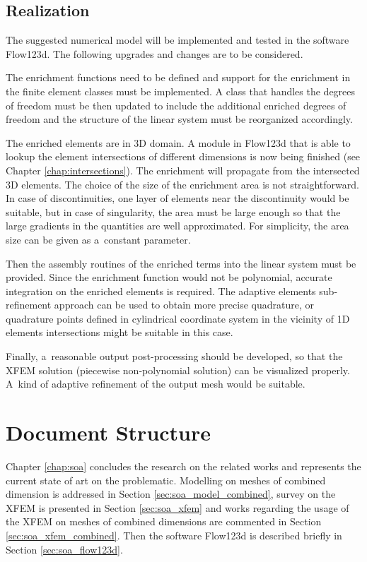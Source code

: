 \documentclass[bibliography=totocnumbered,dvipsnames,FM,Dis]{tulthesis}
\begin{document}
\subsection{Realization} \label{sec:realization}
The suggested numerical model will be implemented and tested in the software Flow123d.
The following upgrades and changes are to be considered.

The enrichment functions need to be defined and support for the enrichment in the finite element classes must be implemented. 
A class that handles the degrees of freedom must be then updated to include the additional enriched degrees of freedom
and the structure of the linear system must be reorganized accordingly.

The enriched elements are in 3D domain. A module in Flow123d that is able to lookup the element intersections
of different dimensions is now being finished (see Chapter \ref{chap:intersections}). The enrichment will propagate from the intersected 3D elements.
The choice of the size of the enrichment area is not straightforward. In case of discontinuities, one layer of elements
near the discontinuity would be suitable, but in case of singularity, the area must be large enough so that 
the large gradients in the quantities are well approximated. For simplicity, the area size can be given as
a~constant parameter.

Then the assembly routines of the enriched terms into the linear system must be provided.
Since the enrichment function would not be polynomial, accurate integration on the enriched elements is required. 
The adaptive elements sub-refinement approach can be used to obtain more precise quadrature, 
or quadrature points defined in cylindrical coordinate system in the vicinity of 1D elements intersections
might be suitable in this case.

Finally, a~reasonable output post-processing should be developed, so that the XFEM solution (piecewise non-polynomial solution)
can be visualized properly. A~kind of adaptive refinement of the output mesh would be suitable.


\section{Document Structure} \label{sec:structure}

Chapter \ref{chap:soa} concludes the research on the related works and represents the current state of art
on the problematic. Modelling on meshes of combined dimension is addressed in Section \ref{sec:soa_model_combined},
survey on the XFEM is presented in Section \ref{sec:soa_xfem} and works regarding the usage of the XFEM on
meshes of combined dimensions are commented in Section \ref{sec:soa_xfem_combined}. Then 
the software Flow123d is described briefly in Section \ref{sec:soa_flow123d}.
\end{document}
